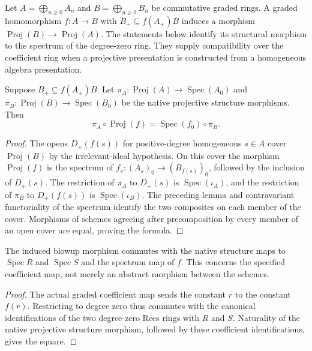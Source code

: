 \endgroup

\begingroup

Let $A=\bigoplus_{n\geq0}A_n$ and $B=\bigoplus_{n\geq0}B_n$ be
commutative graded rings. A graded homomorphism $f:A\to B$ with
$B_+\subseteq f(A_+)B$ induces a morphism
$\operatorname{Proj}(B)\to\operatorname{Proj}(A)$. The statements below
identify its structural morphism to the spectrum of the degree-zero ring.
They supply compatibility over the coefficient ring when a projective
presentation is constructed from a homogeneous algebra presentation.

\begin{theorem}
\label{thm:proj-structure-map-naturality}
\leanok
Suppose $B_+\subseteq f(A_+)B$. Let
$\pi_A:\operatorname{Proj}(A)\to\operatorname{Spec}(A_0)$ and
$\pi_B:\operatorname{Proj}(B)\to\operatorname{Spec}(B_0)$ be the native
projective structure morphisms. Then
\[
\pi_A\circ\operatorname{Proj}(f)
=\operatorname{Spec}(f_0)\circ\pi_B.
\]
\end{theorem}
\begin{proof}
The opens $D_+(f(s))$ for positive-degree homogeneous $s\in A$ cover
$\operatorname{Proj}(B)$ by the irrelevant-ideal hypothesis. On this
cover the morphism $\operatorname{Proj}(f)$ is the spectrum of
$f_s:(A_s)_0\to(B_{f(s)})_0$, followed by the inclusion of $D_+(s)$.
The restriction of $\pi_A$ to $D_+(s)$ is $\operatorname{Spec}(\iota_A)$,
and the restriction of $\pi_B$ to $D_+(f(s))$ is
$\operatorname{Spec}(\iota_B)$. The preceding lemma and contravariant
functoriality of the spectrum identify the two composites on each member
of the cover. Morphisms of schemes agreeing after precomposition by every
member of an open cover are equal, proving the formula.
\end{proof}

\endgroup

\begingroup

\begin{lemma}
\label{lem:affine-blowup-coefficient-square}
\leanok
The induced blowup morphism commutes with the native structure maps
to $\operatorname{Spec}R$ and $\operatorname{Spec}S$ and the spectrum
map of $f$. This concerns the specified coefficient map, not merely
an abstract morphism between the schemes.
\end{lemma}
\begin{proof}
The actual graded coefficient map sends the constant $r$ to the
constant $f(r)$. Restricting to degree zero thus commutes with the
canonical identifications of the two degree-zero Rees rings with
$R$ and $S$. Naturality of the native projective structure morphism,
followed by these coefficient identifications, gives the square.
\end{proof}

